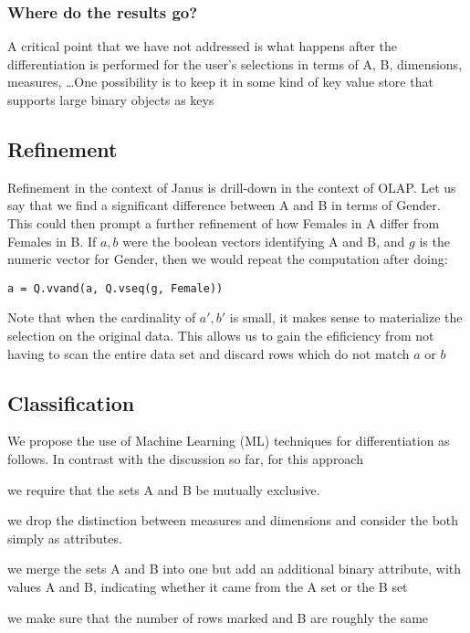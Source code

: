 \subsubsection{Where do the results go?}

A critical point that we have not addressed is what happens after the
differentiation is performed for the user's selections in terms of A, B,
dimensions, measures, \ldots One possibility is to keep it in some kind of key
value store that supports large binary objects as keys

\TBC



\subsection{Refinement}
\label{Refinement}

Refinement in the context of Janus is drill-down in the context of OLAP. 
Let us say that we find a significant difference between A and B in terms of
Gender. This could then prompt a further refinement of how Females in A differ
from Females in B. If \(a, b\) were the boolean vectors identifying A and B,
and \(g\) is the numeric vector for Gender,
then we would repeat the computation after doing:
\begin{verbatim}
a = Q.vvand(a, Q.vseq(g, Female))
\end{verbatim}

Note that when the cardinality of \(a', b'\) is small, it makes sense 
to materialize the selection on the original data. This allows us to gain the
efificiency from not having to scan the entire data set and discard rows which
do not match \(a\) or \(b\)

\subsection{Classification}
\label{Classification}

We propose the use of Machine Learning (ML) techniques for differentiation as
follows. 
In contrast with the discussion so far, for this approach
\be
\item we require that the sets A and B be mutually exclusive.
\item we drop the distinction between measures and dimensions and
consider the both simply as attributes.
\item we merge the sets A and B into one but add an additional 
binary attribute, with values A and B, indicating whether it came from the A set
or the B set
\item we make sure that the number of rows marked and B are roughly the same
\ee

